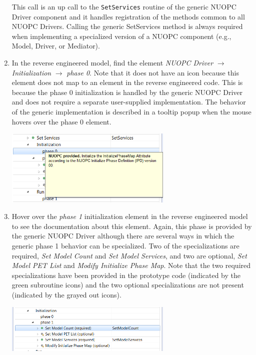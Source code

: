 \documentclass[oneside,11pt]{memoir}
\begin{document}
\begin{enumerate}
This call is an up call to the \texttt{SetServices} routine of the generic NUOPC Driver component and it handles registration of the methods common to all NUOPC Drivers. Calling the generic SetServices method is always required when implementing a specialized version of a NUOPC component (e.g., Model, Driver, or Mediator).

\item In the reverse engineered model, find the element \emph{NUOPC Driver} $\rightarrow$ \emph{Initialization} $\rightarrow$ \emph{phase 0}. Note that it does not have an icon because this element does not map to an element in the reverse engineered code. This is because the phase 0 initialization is handled by the generic NUOPC Driver and does not require a separate user-supplied implementation. The behavior of the generic implementation is described in a tooltip popup when the mouse hovers over the phase 0 element. 

\parbox{\linewidth}{\centering
  \includegraphics[width=8cm]{figs/reveng_fig6.png}
}

\item Hover over the \emph{phase 1} initialization element in the reverse engineered model to see the documentation about this element.  Again, this phase is provided by the generic NUOPC Driver although there are several ways in which the generic phase 1 behavior can be specialized.  Two of the specializations are required, \emph{Set Model Count} and \emph{Set Model Services}, and two are optional, \emph{Set Model PET List} and \emph{Modify Initialize Phase Map}.  Note that the two required specializations have been provided in the prototype code (indicated by the green subroutine icons) and the two optional specializations are not present (indicated by the grayed out icons).

\parbox{\linewidth}{\centering
  \includegraphics[width=8cm]{figs/reveng_fig7.png}
}

\end{enumerate}
\end{document}
